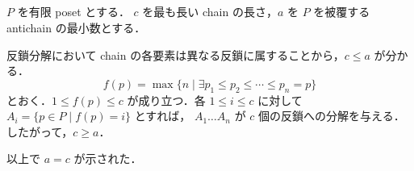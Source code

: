 \subsection{}
$P$ を有限 poset とする．
$c$ を最も長い chain の長さ，$a$ を $P$ を被覆する antichain の最小数とする．

反鎖分解において chain の各要素は異なる反鎖に属することから，$c\leq a$ が分かる．
\[
 f(p) = \max\{n\mid \exists p_1\leq p_2\leq\cdots\leq p_n = p\}
\]
とおく．$1\leq f(p)\leq c$ が成り立つ．各 $1\leq i\leq c$ に対して $A_i = \{p\in P\mid f(p) = i\}$ とすれば，
$A_1\ldots A_n$ が $c$ 個の反鎖への分解を与える．したがって，$c\geq a$．

以上で $a=c$ が示された．